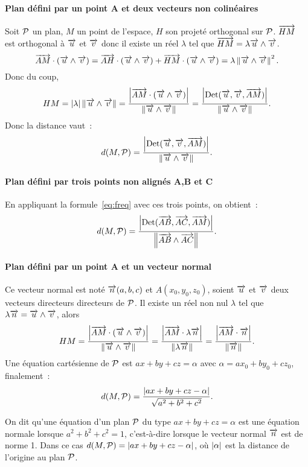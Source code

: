 \paragraph{Plan défini par un point A et deux vecteurs non colinéaires}

Soit $\P$ un plan, $M$ un point de l'espace, $H$ son projeté orthogonal sur $\P$. $\vect{HM}$ est orthogonal à $\vu$ et $\vv$ donc il existe un réel $\lambda$ tel que $\vect{HM}=\lambda \vu\wedge\vv$. 
\begin{equation}
  \vect{AM}\cdot(\vu\wedge\vv)=\vect{AH}\cdot(\vu\wedge\vv)+\vect{HM}\cdot(\vu\wedge\vv)=\lambda \norme{\vu\wedge\vv}^2.
\end{equation}
Donc du coup,
\begin{equation}
  HM=\abs{\lambda} \norme{\vu\wedge\vv}=\frac{\abs{\vect{AM}\cdot(\vu\wedge\vv)}}{\norme{\vu\wedge\vv}}=\frac{\abs{\Det(\vu,\vv,\vect{AM})}}{\norme{\vu\wedge\vv}}.
\end{equation}
Donc la distance vaut~:
\begin{equation}
  \label{eq:freq}
  d(M,\P)=\frac{\abs{\Det(\vu,\vv,\vect{AM})}}{\norme{\vu\wedge\vv}}.
\end{equation}

\paragraph{Plan défini par trois points non alignés A,B et C}

En appliquant la formule~\eqref{eq:freq} avec ces trois points, on obtient~:
\begin{equation}
  d(M,\P)=\frac{\abs{\Det(\vect{AB},\vect{AC},\vect{AM})}}{\norme{\vect{AB}\wedge\vect{AC}}}.
\end{equation}

\paragraph{Plan défini par un point A et un vecteur normal}

Ce vecteur normal est noté $\vn(a,b,c)$ et $A(x_0,y_0,z_0)$, soient $\vu$ et $\vv$ deux vecteurs directeurs directeurs de $\P$. Il existe un réel non nul $\lambda$ tel que $\lambda\vn=\vu\wedge\vv$, alors
\begin{equation}
  HM=\frac{\abs{\vect{AM}\cdot(\vu\wedge\vv)}}{\norme{\vu\wedge\vv}}=\frac{\abs{\vect{AM}\cdot\lambda\vn}}{\norme{\lambda\vn}}=\frac{\abs{\vect{AM}\cdot\vn}}{\norme{\vn}}.
\end{equation}
Une équation cartésienne de $\P$ est $ax+by+cz=\alpha$ avec $\alpha=ax_0+by_0+cz_0$, finalement~:
\begin{equation}
  d(M,\P)=\frac{\abs{ax+by+cz-\alpha}}{\sqrt{a^2+b^2+c^2}}.
\end{equation}
\begin{defdef}
  On dit qu'une équation d'un plan $\P$ du type $ax+by+cz=\alpha$ est une équation normale lorsque $a^2+b^2+c^2=1$, c'est-à-dire lorsque le vecteur normal $\vn$ est de norme 1. Dans ce cas $d(M,\P)=\abs{ax+by+cz-\alpha}$, où $\abs{\alpha}$ est la distance de l'origine au plan $\P$.
\end{defdef}

